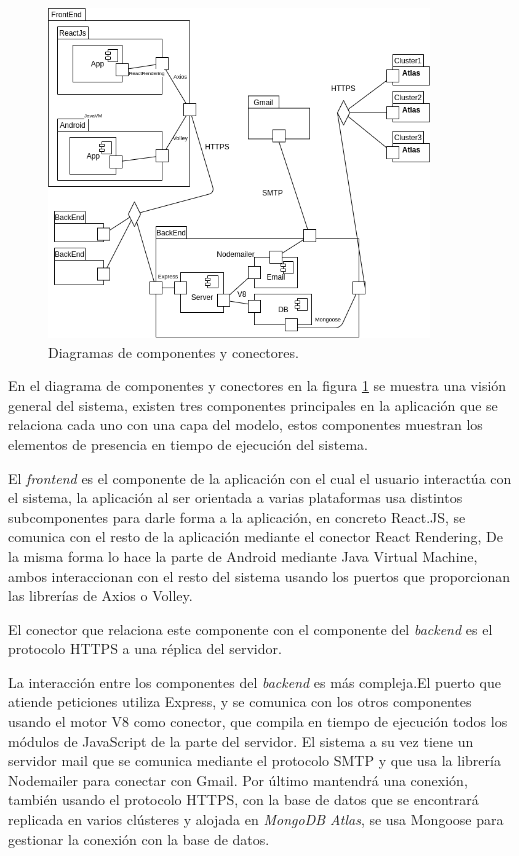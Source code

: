 \documentclass{article}
\begin{document}
\begin{figure}[H]
   \centering
       \includegraphics[width=0.90\textwidth]{../images/cyc.png}
   \caption{Diagramas de componentes y conectores.}
   \label{cyc}
\end{figure}

En el diagrama de componentes y conectores en la figura \ref{cyc} se muestra una visión general del sistema, existen tres componentes principales en la aplicación que se relaciona cada uno con una capa del modelo, estos componentes muestran los elementos de presencia en tiempo de ejecución del sistema.

El \textit{frontend} es el componente de la aplicación con el cual el usuario interactúa con el sistema, la aplicación al ser orientada a varias plataformas usa distintos subcomponentes para darle forma a la aplicación, en concreto React.JS, se comunica con el resto de la aplicación mediante el conector React Rendering, De la misma forma lo hace la parte de Android mediante Java Virtual Machine, ambos interaccionan con el resto del sistema usando los puertos que proporcionan las librerías de Axios o Volley.

El conector que relaciona este componente con el componente del \textit{backend} es el protocolo HTTPS a una réplica del servidor.

La interacción entre los componentes del \textit{backend} es más compleja.El puerto que atiende peticiones utiliza Express, y se comunica con los otros componentes usando el motor V8 como conector, que compila en tiempo de ejecución todos los módulos de JavaScript de la parte del servidor. El sistema a su vez tiene un servidor mail que se comunica mediante el protocolo SMTP y que usa la librería Nodemailer para conectar con Gmail. Por último mantendrá una conexión, también usando el protocolo HTTPS, con la base de datos que se encontrará replicada en varios clústeres y alojada en \textit{MongoDB Atlas}, se usa Mongoose para gestionar la conexión con la base de datos.
\end{document}
